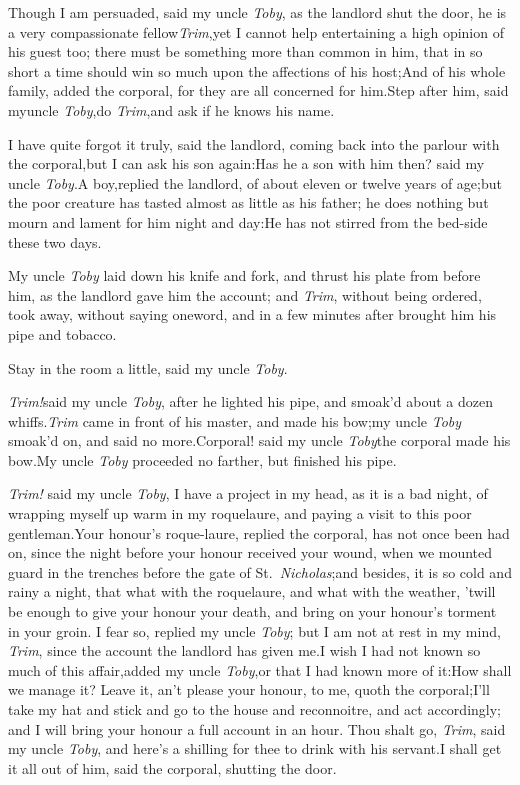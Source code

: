 \documentclass{article}
\begin{document}
Though I am persuaded, said my uncle \textit{Toby}, as the
landlord shut the door, he is a very compassionate
fellow\tsk \textit{Trim},\break\tsk yet I cannot help entertaining a high opinion
of his guest too; there must be something more than common in him,
that in so short a time should win so much upon the affections of
his host;\tsh And of his whole family, added the corporal,
for they are all concerned for him.\tsh Step after him,
said my\pb uncle \textit{Toby},\tsk do \textit{Trim},\tsk and ask if
he knows his name.

\tsh I have quite forgot it truly, said the landlord,
coming back into the parlour with the corporal,\tsk but I can ask
his son again:\tsh Has he a son with him then? said my
uncle \textit{Toby}.\tsk A boy,\break replied the landlord, of about
eleven or twelve years of age;\tsk but the poor creature has
tasted almost as little as his father; he does nothing but mourn
and lament for him night and day:\tsh He has not stirred
from the bed-side these two days.

My uncle \textit{Toby} laid down his knife and fork, and thrust
his plate from before him, as the landlord gave him the account;
and \textit{Trim}, without being ordered, took away, without
saying one\pb word, and in a few minutes after brought him his
pipe and tobacco.

\tsh Stay in the room a little, said my uncle
\textit{Toby}.\tsh

\textit{Trim!}\tsh said my uncle \textit{Toby}, after
he lighted his pipe, and smoak’d about a dozen
whiffs.\tsh \textit{Trim} came in front of his master, and
made his bow;\tsk my uncle \textit{Toby} smoak’d on, and said
no more.\tsh Corporal! said my uncle \textit{Toby}\break\tsh the
corporal made his bow.\tsh\break My uncle \textit{Toby} proceeded
no farther, but finished his pipe.

\textit{Trim!} said my uncle \textit{Toby}, I have a project
in my head, as it is a bad night, of wrapping myself up warm in my
roquelaure, and paying a visit to this poor
gentleman.\tsh Your honour’s roque-\pb laure, replied the
corporal, has not once been had on, since the night before your
honour received your wound, when we mounted guard in the trenches
before the gate of St.~\textit{Nicholas};\tsk and besides, it is so
cold and rainy a night, that what with the roquelaure, and what with the
weather, ’twill be enough to give your honour your death, and
bring on your honour’s torment in your groin. I fear so,
replied my uncle \textit{Toby}; but I am not at rest in my mind,
\textit{Trim}, since the account the landlord has given
me.\tsh I wish I had not known so much of this
affair,\tsk added my uncle \textit{Toby},\tsk or that I had known
more of it:\tsh How shall we manage it? Leave it,
an’t please your honour, to me, quoth the
corporal;\tsh I’ll take my hat and stick and go to
the house and reconnoitre, and act accordingly; and I will bring
your\pb
honour a full account in an hour.\tsh\break
Thou shalt go, \textit{Trim}, said my uncle \textit{Toby}, and
here’s a shilling for thee to drink with his servant.\tsh I
shall get it all out of him, said the corporal, shutting the
door.
\end{document}

